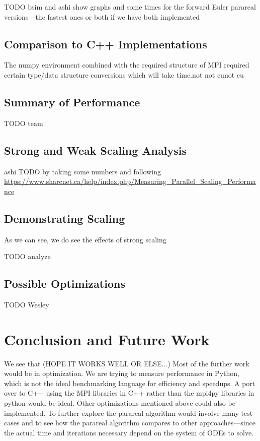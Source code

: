 \documentclass[letterpaper,12pt]{article}
\begin{document}
TODO bsim and ashi show graphs and some times for the forward Euler parareal
versions---the fastest ones or both if we have both implemented

\subsection{Comparison to C++ Implementations}

The numpy environment combined with the required structure of MPI required
certain type/data structure conversions which will take time.not not cunot cu

\subsection{Summary of Performance}

TODO team

\subsection{Strong and Weak Scaling Analysis}

ashi TODO by taking some numbers and following
\url{https://www.sharcnet.ca/help/index.php/Measuring_Parallel_Scaling_Performance}

\subsection{Demonstrating Scaling}

As we can see, we do see the effects of strong scaling

TODO analyze

\subsection{Possible Optimizations}

TODO Wesley

\section{Conclusion and Future Work}

We see that (HOPE IT WORKS WELL OR ELSE...) Most of the further work would be in
optimization. We are trying to measure performance in Python, which is not the
ideal benchmarking language for efficiency and speedups. A port over to C++
using the MPI libraries in C++ rather than the mpi4py libraries in python would
be ideal. Other optimizations mentioned above could also be implemented. To
further explore the parareal algorithm would involve many test cases and to see
how the parareal algorithm compares to other approaches---since the actual time
and iterations necessary depend on the system of ODEs to solve.
\end{document}

